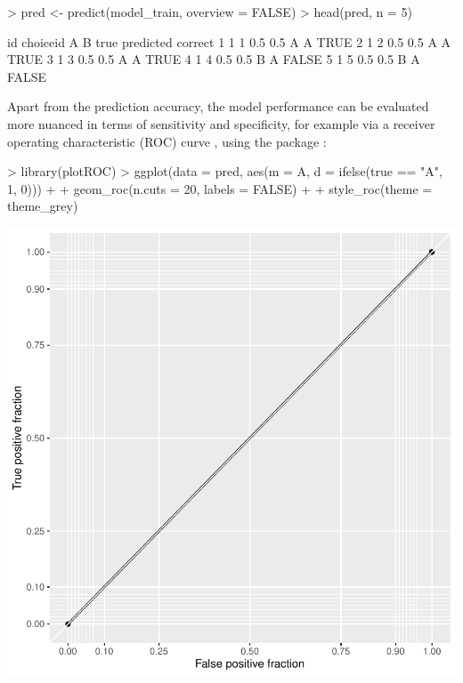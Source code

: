 \documentclass[article,shortnames]{jss}
\begin{document}
\begin{Schunk}
\begin{Sinput}
> pred <- predict(model_train, overview = FALSE)
> head(pred, n = 5)
\end{Sinput}
\begin{Soutput}
  id choiceid   A   B true predicted correct
1  1        1 0.5 0.5    A         A    TRUE
2  1        2 0.5 0.5    A         A    TRUE
3  1        3 0.5 0.5    A         A    TRUE
4  1        4 0.5 0.5    B         A   FALSE
5  1        5 0.5 0.5    B         A   FALSE
\end{Soutput}
\end{Schunk}

Apart from the prediction accuracy, the model performance can be evaluated more nuanced in terms of sensitivity and specificity, for example via a receiver operating characteristic (ROC) curve \citep{Fawcett:2006}, using the  package \citep{Sachs:2017}:

\begin{Schunk}
\begin{Sinput}
> library(plotROC)
> ggplot(data = pred, aes(m = A, d = ifelse(true == "A", 1, 0))) +
+    geom_roc(n.cuts = 20, labels = FALSE) +
+    style_roc(theme = theme_grey)
\end{Sinput}
\end{Schunk}
\includegraphics{rprobitb_oelschlaeger_bauer-roc-example}
\end{document}
